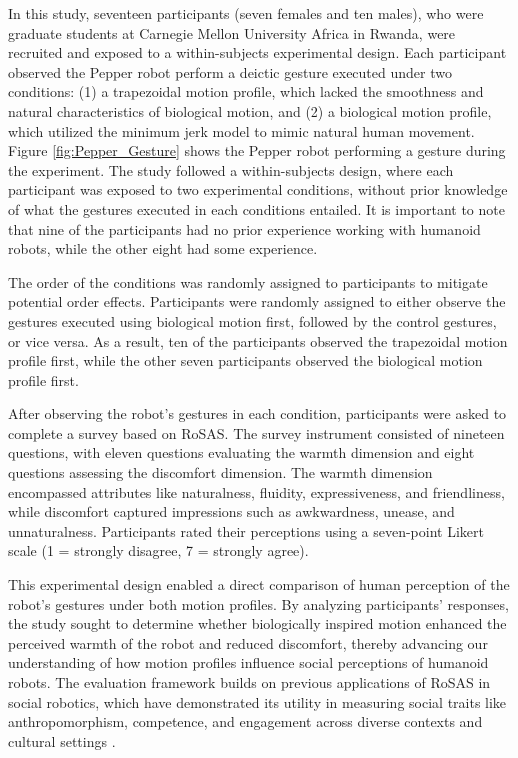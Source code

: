 \documentclass{CSSRforAfrica}
\begin{document}
In this study, seventeen participants (seven females and ten males), who were graduate students at Carnegie Mellon University Africa in Rwanda, were recruited and exposed to a within-subjects experimental design. Each participant observed the Pepper robot perform a deictic gesture executed under two conditions: (1) a trapezoidal motion profile, which lacked the smoothness and natural characteristics of biological motion, and (2) a biological motion profile, which utilized the minimum jerk model to mimic natural human movement. Figure \ref{fig:Pepper_Gesture} shows the Pepper robot performing a gesture during the experiment. The study followed a within-subjects design, where each participant was exposed to two experimental conditions, without prior knowledge of what the gestures executed in each conditions entailed. It is important to note that nine of the participants had no prior experience working with humanoid robots, while the other eight had some experience.


The order of the conditions was randomly assigned to participants to mitigate potential order effects. Participants were randomly assigned to either observe the gestures executed using biological motion first, followed by the control gestures, or vice versa. As a result, ten of the participants observed the trapezoidal motion profile first, while the other seven participants observed the biological motion profile first.

After observing the robot's gestures in each condition, participants were asked to complete a survey based on  RoSAS. The survey instrument consisted of nineteen questions, with eleven questions evaluating the warmth dimension and eight questions assessing the discomfort dimension. The warmth dimension encompassed attributes like naturalness, fluidity, expressiveness, and friendliness, while discomfort captured impressions such as awkwardness, unease, and unnaturalness. Participants rated their perceptions using a seven-point Likert scale (1 = strongly disagree, 7 = strongly agree).

This experimental design enabled a direct comparison of human perception of the robot’s gestures under both motion profiles. By analyzing participants’ responses, the study sought to determine whether biologically inspired motion enhanced the perceived warmth of the robot and reduced discomfort, thereby advancing our understanding of how motion profiles influence social perceptions of humanoid robots. The evaluation framework builds on previous applications of RoSAS in social robotics, which have demonstrated its utility in measuring social traits like anthropomorphism, competence, and engagement across diverse contexts and cultural settings \cite{Scassellatietal2012,Oliveiraetal2021}.
\end{document}
